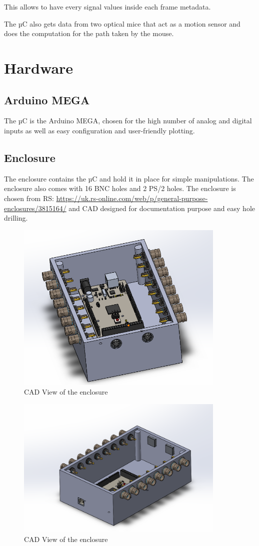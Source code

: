 \documentclass[a4paper]{article}
\begin{document}
This allows to have every signal values inside each frame metadata.

The µC also gets data from two optical mice that act as a motion sensor and does the computation for the path taken by the mouse.

\section{Hardware}
\subsection{Arduino MEGA}
The µC is the Arduino MEGA, chosen for the high number of analog and digital inputs as well as easy configuration and user-friendly plotting.


\subsection{Enclosure}
The enclosure contains the µC and hold it in place for simple manipulations. The enclosure also comes with 16 BNC holes and 2 PS/2 holes.
The enclosure is chosen from RS: \url{https://uk.rs-online.com/web/p/general-purpose-enclosures/3815164/} and CAD designed for documentation purpose and easy hole drilling.

\begin{figure}[h!t!b!]
    \centering
        \includegraphics[width = 10cm]{images/enclosure.PNG}
    \caption{CAD View of the enclosure}
    \label{fig:enclosure1}
\end{figure}

\begin{figure}[h!t!b!]
    \centering
        \includegraphics[width = 10cm]{images/enclosure2.PNG}
    \caption{CAD View of the enclosure}
    \label{fig:enclosure2}
\end{figure}
\end{document}
